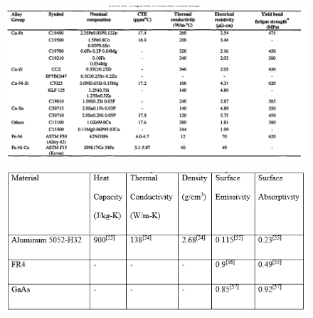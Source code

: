\documentclass[final]{cubedoc}
\begin{document}
	
	\begin{figure}[h!]
		\centering
		\includegraphics[keepaspectratio, width=\textwidth]{docs/copper_alloys_blackwell.png}
		\caption{\cite[p.55]{pecht1998electronic}}
		\label{fig:copper_alloys}
	\end{figure}
	
	\begin{figure}[h!]
		\centering
		\includegraphics[keepaspectratio, width=\textwidth]{docs/fr4_emiss.png}
		\caption{\cite[p.93]{rathbun2017design}}
		\label{fig:fr4}
	\end{figure}
	
\end{document}
